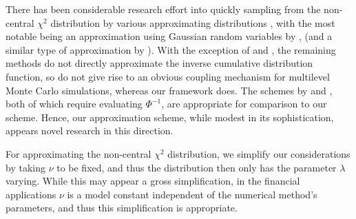 \documentclass[9pt,a4paper,english]{extarticle}
\begin{document}
There has been considerable research effort into quickly sampling from the non-central $ \chi^2 $ distribution by various approximating distributions \citep{johnson1995continuous,sankaran1959non,abdel1954approximate,wilson1931distribution,hoaglin1977direct,shea1991algorithm,best1975algorithm,rice1968uniform}, with the most notable being an approximation using Gaussian random variables by \citet{abdel1954approximate}, (and a similar type of approximation by \citet{sankaran1959non}). With the exception of \citet{abdel1954approximate} and \citet{sankaran1959non}, the remaining methods do not directly approximate the inverse cumulative distribution function, so do not give rise to an obvious coupling mechanism for multilevel Monte Carlo simulations, whereas our framework does. The schemes by \citet{abdel1954approximate} and \citet{sankaran1959non}, both of which require evaluating $ \Phi^{-1} $, are appropriate for comparison to our scheme. Hence, our approximation scheme, while modest in its sophistication, appears novel research in this direction.

For approximating the non-central $ \chi^2 $ distribution, we simplify our considerations by taking $ \nu $ to be fixed, and thus the distribution then only has the parameter $ \lambda $ varying. While this may appear a gross simplification, in the financial applications $ \nu $ is a model constant independent of the numerical method's parameters, and thus this simplification is appropriate.
\end{document}
